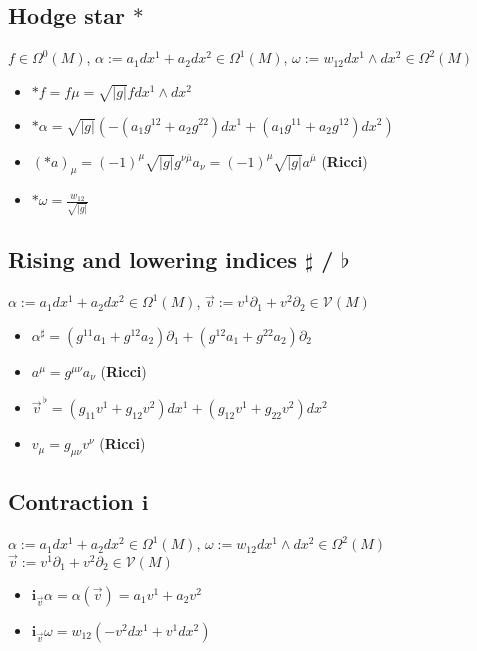 \documentclass{scrartcl}
\newcommand{\vecflat}[1]{\vec{#1}^{\,\flat}}
\renewcommand{\i}{\mathbf{i}}
\begin{document}
    \subsection{Hodge star \( * \)}
      \( f\in \Omega^{0}(M)\),
      \( \alpha:= a_{1}dx^{1} + a_{2}dx^{2} \in \Omega^{1}(M) \),
      \( \omega:= w_{12}dx^{1}\wedge dx^{2} \in \Omega^{2}(M) \)
      \begin{itemize}
        \item \( *f = f\mu = \sqrt{|g|}f dx^{1}\wedge dx^{2}\)
        \item \( *\alpha = \sqrt{|g|}\left( -\left( a_{1}g^{12} + a_{2}g^{22} \right)dx^{1} 
                                            +\left( a_{1}g^{11} + a_{2}g^{12} \right)dx^{2}\right) \)
        \item \( (*a)_{\mu} =  \left( -1 \right)^{\mu} \sqrt{|g|} g^{\nu\bar{\mu}}a_{\nu}
                          = \left( -1 \right)^{\mu} \sqrt{|g|} a^{\bar{\mu}}\)
                          (\textbf{Ricci})
        \item \( *\omega = \frac{w_{12}}{\sqrt{|g|}} \)
      \end{itemize}

    \subsection{Rising and lowering indices \( \sharp \) / \( \flat \)}
      \( \alpha:= a_{1}dx^{1} + a_{2}dx^{2} \in \Omega^{1}(M) \),
      \( \vec{v} := v^{1}\partial_{1} + v^{2}\partial_{2}\in\mathcal{V}(M) \)
      \begin{itemize}
        \item \( \alpha^{\sharp} = \left( g^{11}a_{1}+g^{12}a_{2} \right)\partial_{1} + \left( g^{12}a_{1}+g^{22}a_{2} \right)\partial_{2}\)
        \item \( a^{\mu} = g^{\mu\nu}a_{\nu}\) (\textbf{Ricci})
        \item \( \vecflat{v} = \left( g_{11}v^{1} + g_{12}v^{2} \right)dx^{1} + \left( g_{12}v^{1} + g_{22}v^{2} \right)dx^{2} \)
        \item \( v_{\mu} = g_{\mu\nu}v^{\nu} \) (\textbf{Ricci})
      \end{itemize}

    \subsection{Contraction \( \i \)}
      \( \alpha:= a_{1}dx^{1} + a_{2}dx^{2} \in \Omega^{1}(M) \),
      \( \omega:= w_{12}dx^{1}\wedge dx^{2} \in \Omega^{2}(M)\)
      \( \vec{v} := v^{1}\partial_{1} + v^{2}\partial_{2}\in\mathcal{V}(M) \)
      \begin{itemize}
        \item \( \i_{\vec{v}}\alpha = \alpha\left( \vec{v} \right) = a_{1}v^{1} + a_{2}v^{2} \)
        \item \( \i_{\vec{v}}\omega = w_{12}\left( -v^{2}dx^{1} + v^{1}dx^{2} \right) \)
      \end{itemize}
\end{document}
